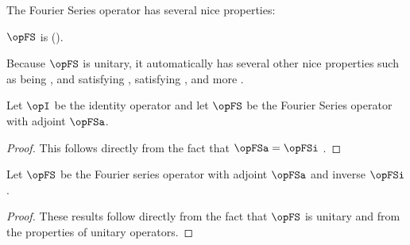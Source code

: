 The Fourier Series operator has several nice properties:
\begin{liste}
  \item $\opFS$ is 
    ().
  \item Because $\opFS$ is unitary, it automatically has several other nice
        properties such as being , and satisfying
        , satisfying , and more
        .
\end{liste}

\begin{corollary}
\label{cor:fs_unitary}
  
Let $\opI$ be the identity operator
and let $\opFS$ be the Fourier Series operator with
adjoint $\opFSa$.
\end{corollary}
\begin{proof}
This follows directly from the fact that $\opFSa=\opFSi$ .
\end{proof}

\begin{corollary}
\label{cor:fs_prop}
  
Let $\opFS$ be the Fourier series operator with adjoint $\opFSa$ and inverse $\opFSi$.
\end{corollary}
\begin{proof}
These results follow directly from the fact that $\opFS$
is unitary  and from
the properties of unitary operators.
\end{proof}

